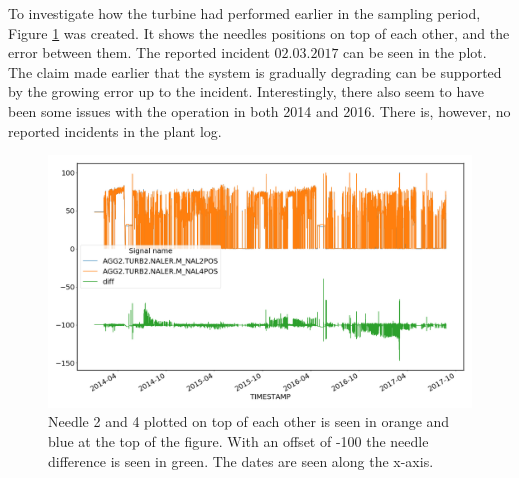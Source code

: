         
        To investigate how the turbine had performed earlier in the sampling period, Figure \ref{fig:plant1_needle_error} was created. It shows the needles positions on top of each other, and the error between them. The reported incident $02.03.2017$ can be seen in the plot. The claim made earlier that the system is gradually degrading can be supported by the growing error up to the incident. Interestingly, there also seem to have been some issues with the operation in both 2014 and 2016. There is, however, no reported incidents in the plant log. 
        \begin{figure}
            \centering
            \includegraphics[width=\textwidth]{report/figures/data/turbine2_needle2_4.png}
            \caption{Needle 2 and 4 plotted on top of each other is seen in orange and blue at the top of the figure. With an offset of -100 the needle difference is seen in green. The dates are seen along the x-axis.}
            \label{fig:plant1_needle_error}
        \end{figure}
        
